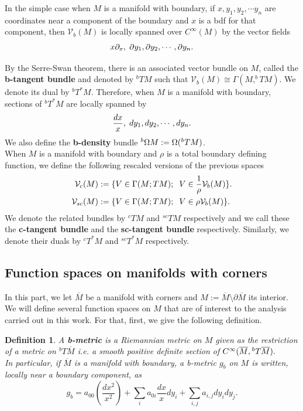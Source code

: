 \documentclass[a4paper,11pt]{article}
\newcounter{mythm}[section]
\newtheorem{defi}[mythm]{Definition}
\begin{document}
In the simple case when $M$ is a manifold with boundary, if $x, y_1, y_2, \cdots y_n$ are coordinates near a component of the boundary and $x$ is a bdf for that component, then $\mathcal{V}_b(M)$ is locally spanned over $C^\infty (M)$ by the vector fields 
$$
x \partial_x , \hspace{0.1cm} \partial y_1, \partial y_2, \cdots , \partial y_n. 
$$

By the Serre-Swan theorem, there is an associated vector bundle on $M$, called the \textbf{b-tangent bundle} and denoted by \textbf{$^{b} T M$} such that $\mathcal{V}_b(M) \cong \Gamma (M, ^{b} T M)$. We denote its dual by $^{b}T^{*} M$. Therefore, when $M$ is a manifold with boundary, sections of $^{b}T^{*} M$ are locally spanned by 
$$
\frac{dx}{x} , \hspace{0.1cm} d y_1, d y_2, \cdots , d y_n. 
$$
We also define the \textbf{b-density} bundle $^{b} \Omega M := \Omega ( \hspace{0.01cm}^{b} T M)$. \\

When $M$ is a manifold with boundary and $\rho$ is a total boundary defining function, we define the following rescaled versions of the previous spaces
\begin{align*}
\mathcal{V}_c(M) & := \{ V \in \Gamma(M; TM); \hspace{0,2cm} V\in \frac{1}{\rho} \mathcal{V}_b(M) \}.\\ \mathcal{V}_{sc}(M) & := \{ V \in \Gamma(M; TM); \hspace{0,2cm} V\in \rho \mathcal{V}_b(M) \}.
\end{align*}
We denote the related bundles by $^{c} T M$ and $^{sc} T M$ respectively and we call these the \textbf{c-tangent bundle} and the \textbf{sc-tangent bundle} respectively. Similarly, we denote their duals by $^{c} T^{*} M$ and $^{sc} T^{*} M$ respectively.

\subsection{Function spaces on manifolds with corners}
In this part, we let $\overline{M}$ be a manifold with corners and $M := \overline{M} \setminus \partial \overline{M} $ its interior. We will define several function spaces on $M$ that are of interest to the analysis carried out in this work. For that, first, we give the following definition. 
\begin{defi}
    A \textbf{b-metric} is a Riemannian metric on $M$ given as the restriction of a metric on $^{b} T \overline{M}$ i.e. a smooth positive definite section of $C^\infty (\overline{M}, \hspace{0.01cm} ^{b}T \overline{M}).$\\
    In particular, if $\overline{M}$ is a manifold with boundary, a b-metric $g_b$ on $M$ is written, locally near a boundary component, as 
$$
g_b = a_{00} \left( \frac{dx^2}{x^2} \right) + \sum_{i} a_{0i} \frac{dx}{x} dy_i
 + \sum_{i,j} a_{i,j} dy_i dy_j.$$
\end{defi}
\end{document}

